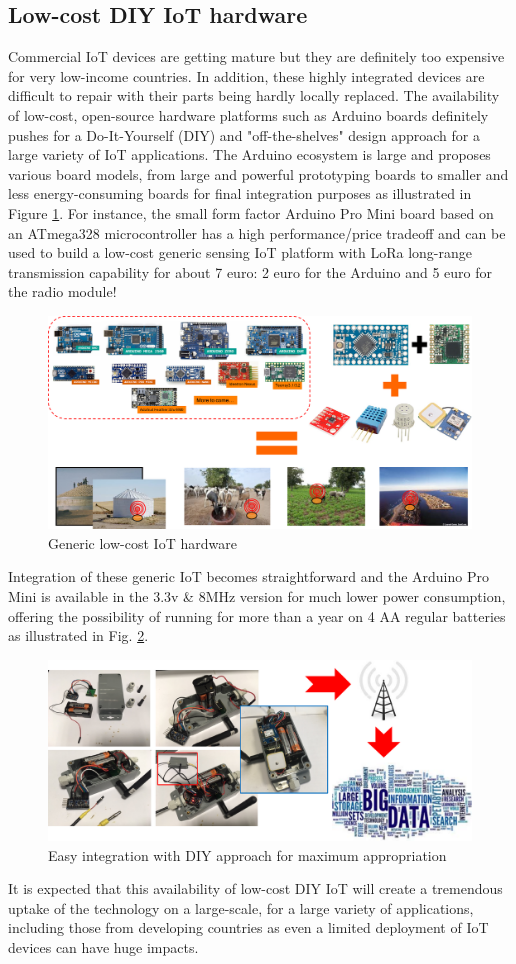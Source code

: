 \subsection{Low-cost DIY IoT hardware}

Commercial IoT devices are getting mature but they are definitely too expensive for very low-income countries. In addition, these highly integrated devices are difficult to repair with their parts being hardly locally replaced.  The availability of low-cost, open-source hardware platforms such as Arduino boards definitely pushes for a Do-It-Yourself (DIY) and "off-the-shelves" design approach for a large variety of IoT applications. The Arduino ecosystem is large and proposes various board models, from large and powerful prototyping boards to smaller and less energy-consuming boards for final integration purposes as illustrated in Figure \ref{figure-generic-iot}. For instance, the small form factor Arduino Pro Mini board based on an ATmega328 microcontroller has a high performance/price tradeoff and can be used to build a low-cost generic sensing IoT platform with LoRa long-range transmission capability for about 7 euro: 2 euro for the Arduino and 5 euro for the radio module!

\begin{figure}  
\centering  
\includegraphics[width=.75\linewidth]{figures/generic-iot}   
\caption{Generic low-cost IoT hardware}   
\label{figure-generic-iot}  
\end{figure} 

Integration of these generic IoT becomes straightforward and the Arduino Pro Mini is available in the 3.3v \& 8MHz version for much lower power consumption, offering the possibility of running for more than a year on 4 AA regular batteries as illustrated in Fig. \ref{figure-easy-integration}. 

\begin{figure} 
\centering  
\includegraphics[width=.8\linewidth]{figures/easy-integration}   
\caption{Easy integration with DIY approach for maximum appropriation}   
\label{figure-easy-integration}  
\end{figure} 

It is expected that this availability of low-cost DIY IoT will create a tremendous uptake of the technology on a large-scale, for a large variety of applications, including those from developing countries as even a limited deployment of IoT devices can have huge impacts.

